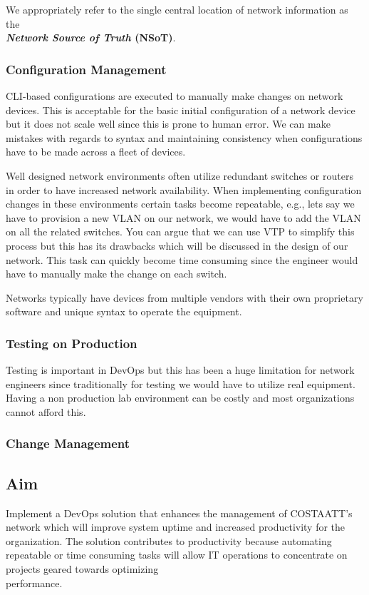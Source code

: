 \documentclass[12pt, letterpaper]{article}
\begin{document}
\smallskip

We appropriately refer to the single central location of network information as the
 \\ \textbf{\textit{Network Source of Truth} (NSoT)}.
	
	\subsubsection{Configuration Management}
CLI-based configurations are executed to manually make changes on network devices. This is acceptable for the basic initial configuration of a network device but it does not scale well since this is prone to human error. We can make mistakes with regards to syntax and maintaining consistency when configurations have to be made across a fleet of devices. 

\smallskip

Well designed network environments often utilize redundant switches or routers in order to have increased network availability. When implementing configuration changes in these environments certain tasks become repeatable, e.g., lets say we have to provision a new VLAN on our network, we would have to add the VLAN on all the related switches. You can argue that we can use VTP to simplify this process but this has its drawbacks which will be discussed in the design of our network. This task can quickly become time consuming since the engineer would have to manually make the change on each switch.

\smallskip

Networks typically have devices from multiple vendors with their own proprietary \\ software and unique syntax to operate the equipment.
	
	\subsubsection{Testing on Production}
Testing is important in DevOps but this has been a huge limitation for network engineers since traditionally for testing we would have to utilize real equipment. Having a non production lab environment can be costly and most organizations cannot afford this. 
	
	\subsubsection{Change Management}


	\subsection{Aim}
Implement a DevOps solution that enhances the management of COSTAATT's network which will improve system uptime and increased productivity for the organization. The solution contributes to productivity because automating repeatable or time consuming tasks will allow IT operations to concentrate on projects geared towards optimizing \\ performance.
\end{document}

